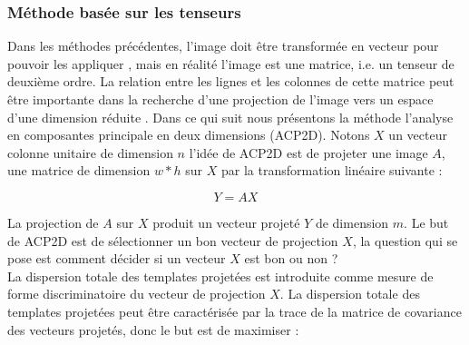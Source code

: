 \subsubsection{Méthode basée sur les tenseurs }
Dans les méthodes précédentes, l’image doit être transformée en vecteur pour pouvoir les appliquer \citep{wang2006palmprint}, mais en réalité l’image est une matrice, i.e. un tenseur de deuxième ordre. La relation entre les lignes et les colonnes de cette matrice peut être importante dans la recherche d’une projection de l’image vers un espace d’une dimension réduite \citep{xiao2010novel}. Dans ce qui suit nous présentons la méthode l’analyse en composantes principale en deux dimensions (ACP2D).
Notons $X$ un vecteur colonne unitaire de dimension $n$ l’idée de ACP2D est de projeter une image $A$, une matrice de dimension $w*h$ sur $X$ par la transformation linéaire suivante :
\begin{center}
	\begin{equation}\label{eq:chapitre3eq15}
	Y=AX
	\end{equation}
\end{center}
La projection de $A$ sur $X$ produit un vecteur projeté $Y$ de dimension $m$.
Le but de ACP2D est de sélectionner un bon vecteur de projection $X$, la question qui se pose est comment décider si un vecteur $X$ est bon ou non ?\\
La dispersion totale des templates projetées est introduite comme mesure de forme discriminatoire du vecteur de projection $X$. La dispersion totale des templates projetées peut être caractérisée par la trace de la matrice de covariance des vecteurs projetés, donc le but est de maximiser :


